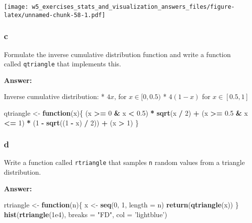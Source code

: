 \documentclass[]{article}
\newenvironment{Shaded}{\begin{snugshade}}{\end{snugshade}}
\newcommand{\ControlFlowTok}[1]{\textcolor[rgb]{0.13,0.29,0.53}{\textbf{#1}}}
\newcommand{\DataTypeTok}[1]{\textcolor[rgb]{0.13,0.29,0.53}{#1}}
\newcommand{\DecValTok}[1]{\textcolor[rgb]{0.00,0.00,0.81}{#1}}
\newcommand{\FloatTok}[1]{\textcolor[rgb]{0.00,0.00,0.81}{#1}}
\newcommand{\KeywordTok}[1]{\textcolor[rgb]{0.13,0.29,0.53}{\textbf{#1}}}
\newcommand{\NormalTok}[1]{#1}
\newcommand{\OperatorTok}[1]{\textcolor[rgb]{0.81,0.36,0.00}{\textbf{#1}}}
\newcommand{\StringTok}[1]{\textcolor[rgb]{0.31,0.60,0.02}{#1}}
\begin{document}
\texttt{[image: w5\_exercises\_stats\_and\_visualization\_answers\_files/figure-latex/unnamed-chunk-58-1.pdf]}

\hypertarget{c-10}{%
\subsubsection{c}\label{c-10}}

Formulate the inverse cumulative distribution function and write a
function called \texttt{qtriangle} that implements this.

\textbf{Answer:}

Inverse cumulative distribution: * \(4x\), for \(x\in [0, 0.5)\) *
\(4(1-x)\) for \(x\in [0.5, 1]\)

\begin{Shaded}
\begin{Highlighting}[]
\NormalTok{qtriangle <-}\StringTok{ }\ControlFlowTok{function}\NormalTok{(x)\{}
\NormalTok{  (x }\OperatorTok{>=}\StringTok{ }\DecValTok{0} \OperatorTok{&}\StringTok{ }\NormalTok{x }\OperatorTok{<}\StringTok{ }\FloatTok{0.5}\NormalTok{) }\OperatorTok{*}\StringTok{ }\KeywordTok{sqrt}\NormalTok{(x }\OperatorTok{/}\StringTok{ }\DecValTok{2}\NormalTok{) }\OperatorTok{+}\StringTok{ }\NormalTok{(x }\OperatorTok{>=}\StringTok{ }\FloatTok{0.5} \OperatorTok{&}\StringTok{ }\NormalTok{x }\OperatorTok{<=}\StringTok{ }\DecValTok{1}\NormalTok{) }\OperatorTok{*}\StringTok{ }\NormalTok{(}\DecValTok{1} \OperatorTok{-}\StringTok{ }\KeywordTok{sqrt}\NormalTok{((}\DecValTok{1} \OperatorTok{-}\StringTok{ }\NormalTok{x) }\OperatorTok{/}\StringTok{ }\DecValTok{2}\NormalTok{)) }\OperatorTok{+}\StringTok{ }\NormalTok{(x }\OperatorTok{>}\StringTok{ }\DecValTok{1}\NormalTok{)}
\NormalTok{\}}
\end{Highlighting}
\end{Shaded}

\hypertarget{d-7}{%
\subsubsection{d}\label{d-7}}

Write a function called \texttt{rtriangle} that samples \texttt{n}
random values from a triangle distribution.

\textbf{Answer:}

\begin{Shaded}
\begin{Highlighting}[]
\NormalTok{rtriangle <-}\StringTok{ }\ControlFlowTok{function}\NormalTok{(n)\{}
\NormalTok{  x <-}\StringTok{ }\KeywordTok{seq}\NormalTok{(}\DecValTok{0}\NormalTok{, }\DecValTok{1}\NormalTok{, }\DataTypeTok{length =}\NormalTok{ n)}
  \KeywordTok{return}\NormalTok{(}\KeywordTok{qtriangle}\NormalTok{(x))}
\NormalTok{\}}
\KeywordTok{hist}\NormalTok{(}\KeywordTok{rtriangle}\NormalTok{(}\FloatTok{1e4}\NormalTok{), }\DataTypeTok{breaks =} \StringTok{"FD"}\NormalTok{, }\DataTypeTok{col =} \StringTok{'lightblue'}\NormalTok{)}
\end{Highlighting}
\end{Shaded}
\end{document}
